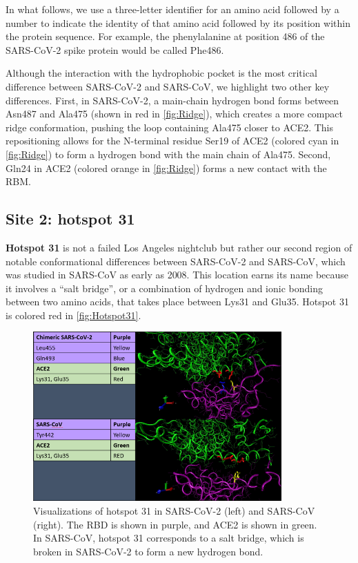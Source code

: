 In what follows, we use a three-letter identifier for an amino acid followed by a number to indicate the identity of that amino acid followed by its position within the protein sequence. For example, the phenylalanine at position 486 of the SARS-CoV-2 spike protein would be called Phe486.

Although the interaction with the hydrophobic pocket is the most critical difference between SARS-CoV-2 and SARS-CoV, we highlight two other key differences. First, in SARS-CoV-2, a main-chain hydrogen bond forms between Asn487 and Ala475 (shown in red in \autoref{fig:Ridge}), which creates a more compact ridge conformation, pushing the loop containing Ala475 closer to ACE2. This repositioning allows for the N-terminal residue Ser19 of ACE2 (colored cyan in \autoref{fig:Ridge}) to form a hydrogen bond with the main chain of Ala475. Second, Gln24 in ACE2 (colored orange in \autoref{fig:Ridge}) forms a new contact with the RBM.

\FloatBarrier
{}
\subsection{Site 2: hotspot 31}

\textbf{Hotspot 31} is not a failed Los Angeles nightclub but rather our second region of notable conformational differences between SARS-CoV-2 and SARS-CoV, which was studied in SARS-CoV as early as 2008. This location earns its name because it involves a ``salt bridge'', or a combination of hydrogen and ionic bonding between two amino acids, that takes place between Lys31 and Glu35. Hotspot 31 is colored red in \autoref{fig:Hotspot31}.\\

\begin{qbox}\end{qbox}

\begin{figure}[h]
	\centering
	\mySfFamily
	\includegraphics[width = 0.85\textwidth]{../images/Hotspot31.png}
	\caption{Visualizations of hotspot 31 in SARS-CoV-2 (left) and SARS-CoV (right). The RBD is shown in purple, and ACE2 is shown in green. In SARS-CoV, hotspot 31 corresponds to a salt bridge, which is broken in SARS-CoV-2 to form a new hydrogen bond.}
	\label{fig:Hotspot31}
\end{figure}

